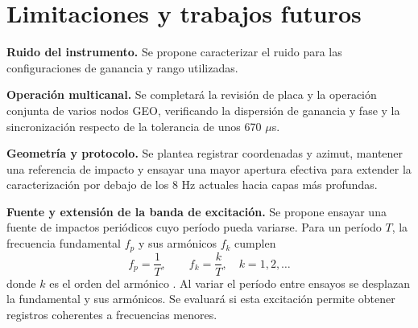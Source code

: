 \section{Limitaciones y trabajos futuros}
\label{sec:limitaciones}

\textbf{Ruido del instrumento.} Se propone caracterizar el ruido para las configuraciones de ganancia y rango utilizadas.

\textbf{Operación multicanal.} Se completará la revisión de placa y la operación conjunta de varios nodos GEO, verificando la dispersión de ganancia y fase y la sincronización respecto de la tolerancia de unos 670 $\mu$s.

\textbf{Geometría y protocolo.} Se plantea registrar coordenadas y azimut, mantener una referencia de impacto y ensayar una mayor apertura efectiva para extender la caracterización por debajo de los 8 Hz actuales hacia capas más profundas.

\textbf{Fuente y extensión de la banda de excitación.} Se propone ensayar una fuente de impactos periódicos cuyo período pueda variarse. Para un período $T$, la frecuencia fundamental $f_p$ y sus armónicos $f_k$ cumplen
\begin{equation}
f_p=\frac{1}{T},\qquad f_k=\frac{k}{T},
\quad k=1,2,\ldots
\label{eq:fuente-periodica}
\end{equation}
donde $k$ es el orden del armónico . Al variar el período entre ensayos se desplazan la fundamental y sus armónicos. Se evaluará si esta excitación permite obtener registros coherentes a frecuencias menores.
